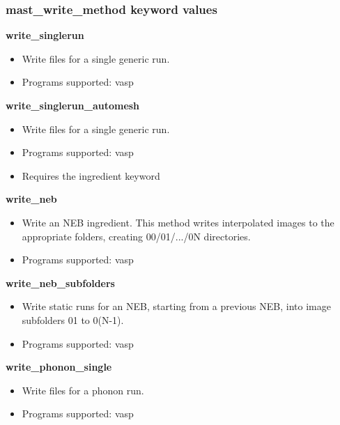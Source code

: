 \documentclass[letterpaper,10pt,english]{sphinxmanual}
\begin{document}
\subsubsection{mast\_write\_method keyword values}
\label{3_1_2_ingredients:mast-write-method-keyword-values}
\textbf{write\_singlerun}
\begin{itemize}
\item {} 
Write files for a single generic run.

\item {} 
Programs supported: vasp

\end{itemize}

\textbf{write\_singlerun\_automesh}
\begin{itemize}
\item {} 
Write files for a single generic run.

\item {} 
Programs supported: vasp

\item {} 
Requires the  ingredient keyword

\end{itemize}

\textbf{write\_neb}
\begin{itemize}
\item {} 
Write an NEB ingredient. This method writes interpolated images to the appropriate folders, creating 00/01/.../0N directories.

\item {} 
Programs supported: vasp

\end{itemize}

\textbf{write\_neb\_subfolders}
\begin{itemize}
\item {} 
Write static runs for an NEB, starting from a previous NEB, into image subfolders 01 to 0(N-1).

\item {} 
Programs supported: vasp

\end{itemize}

\textbf{write\_phonon\_single}
\begin{itemize}
\item {} 
Write files for a phonon run.

\item {} 
Programs supported: vasp

\end{itemize}
\end{document}
